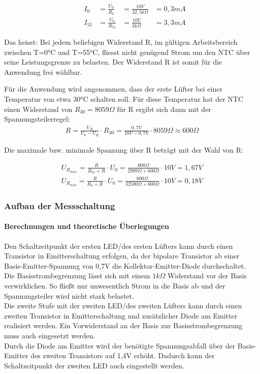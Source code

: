 \begin{align}
&I_0 &=\frac{U_0}{R_0}&=\frac{10V}{32,5k\Omega}&=0,3mA
\\&I_{55} &=\frac{U_0}{R_{55}}&=\frac{10V}{3k\Omega}&=3,3mA
\end{align}

Das heisst: Bei jedem beliebigen Widerstand R, im gültigen Arbeitsbereich zwischen T=0°C und T=55°C, fliesst nicht genügend Strom um den NTC über seine Leistungsgrenze zu belasten.
Der Widerstand R ist somit für die Anwendung frei wählbar.

Für die Anwendung wird angenommen, dass der erste Lüfter bei einer Temperatur von etwa 30°C schalten soll. Für diese Temperatur hat der NTC einen Widerstand von \(R_{30} = 8059 \Omega\) für R ergibt sich dann mit der Spannungsteilerregel:
\begin{align}
R=\frac{U_R}{U_0-U_R}\cdot R_{30} = \frac{0,7V}{10V-0,7V}\cdot 8059\Omega \approx 600\Omega \label{eqn:temp}
\end{align}

Die maximale bzw. minimale Spannung über R beträgt mit der Wahl von R:

\begin{align}
U_{R_{max}} = \frac{R}{R_{55}+R}\cdot U_0 = \frac{600\Omega}{2989\Omega + 600\Omega}\cdot 10V = 1,67V\\
U_{R_{min}} = \frac{R}{R_{0}+R}\cdot U_0 = \frac{600\Omega}{32500\Omega + 600\Omega}\cdot 10V = 0,18V
\end{align}

\subsubsection{Aufbau der Messschaltung}

\paragraph{Berechnungen und theoretische Überlegungen}
Den Schaltzeitpunkt der ersten LED/des ersten Lüfters kann durch einen Transistor in Emitterschaltung erfolgen, da der bipolare Transistor ab einer Basis-Emitter-Spannung von 0,7V die Kollektor-Emitter-Diode durchschaltet.\\
Die Basisstrombegrenzung lässt sich mit einem \(1k\Omega\) Widerstand vor der Basis verwirklichen. So fließt nur unwesentlich Strom in die Basis ab und der Spannungsteiler wird nicht stark belastet.\\

Die zweite Stufe mit der zweiten LED/des zweiten Lüfters kann durch einen zweiten Transistor in Emitterschaltung und zusätzlicher Diode am Emitter realisiert werden. Ein Vorwiderstand an der Basis zur Basisstrombegrenzung muss auch eingesetzt werden.\\
Durch die Diode am Emitter wird der benötigte Spannungsabfall über der Basis-Emitter des zweiten Transistors auf 1,4V erhöht. Dadurch kann der Schaltzeitpunkt der zweiten LED auch eingestellt werden.

